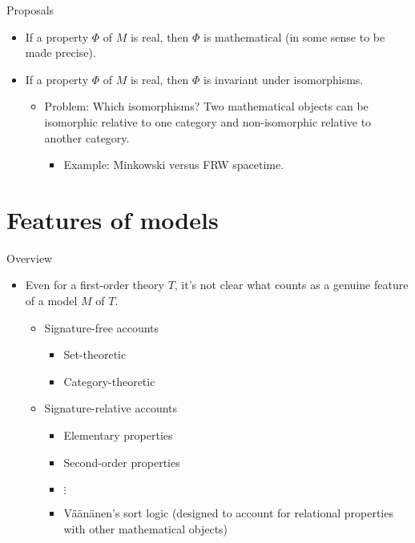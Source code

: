 \documentclass{beamer}
\begin{document}
\begin{frame}{Proposals}

\begin{itemize}
\item If a property $\Phi$ of $M$ is real, then $\Phi$ is mathematical
  (in some sense to be made precise).
\item If a property $\Phi$ of $M$ is real, then $\Phi$ is invariant
  under isomorphisms.
  \begin{itemize}
  \item Problem: Which isomorphisms? Two mathematical objects can be
    isomorphic relative to one category and non-isomorphic relative to
    another category.
    \begin{itemize}
    \item Example: Minkowski versus FRW spacetime.

    \end{itemize}
  \end{itemize}
\end{itemize}
\end{frame}

\section{Features of models}

\begin{frame}{Overview}

\begin{itemize}
\item Even for a first-order theory $T$, it's not clear what counts as
  a genuine feature of a model $M$ of $T$.

  \begin{itemize}
  \item Signature-free accounts
    \begin{itemize}
    \item Set-theoretic
    \item Category-theoretic
    \end{itemize}
  \item Signature-relative accounts
    \begin{itemize}
    \item Elementary properties
    \item Second-order properties
    \item $\vdots$   
    \item Väänänen's sort logic (designed to account for relational
      properties with other mathematical objects)
    \end{itemize}
  \end{itemize}
\end{itemize}  


\end{frame}
\end{document}
